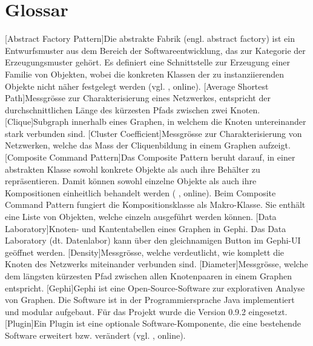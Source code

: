 \chapter*{Glossar}

\begin{acronym}
    [Abstract Factory Pattern]{Die abstrakte Fabrik (engl. abstract factory) ist ein Entwurfsmuster aus dem Bereich der Softwareentwicklung, das zur Kategorie der Erzeugungsmuster gehört. Es definiert eine Schnittstelle zur Erzeugung einer Familie von Objekten, wobei die konkreten Klassen der zu instanziierenden Objekte nicht näher festgelegt werden (vgl. \citeauthor{wikipedia_abstrakte_2018} \citeyear{wikipedia_abstrakte_2018}, online).}
    [Average Shortest Path]{Messgrösse zur Charakterisierung eines Netzwerkes, entspricht der durchschnittlichen Länge des kürzesten Pfads zwischen zwei Knoten.}
    [Clique]{Subgraph innerhalb eines Graphen, in welchem die Knoten untereinander stark verbunden sind.}
    [Cluster Coefficient]{Messgrösse zur Charakterisierung von Netzwerken, welche das Mass der Cliquenbildung in einem Graphen aufzeigt.}
    [Composite Command Pattern]{Das Composite Pattern beruht darauf, in einer abstrakten Klasse sowohl konkrete Objekte als auch ihre Behälter zu repräsentieren. Damit können sowohl einzelne Objekte als auch ihre Kompositionen einheitlich behandelt werden (\citeauthor{wikipedia_kompositum_2019} \citeyear{wikipedia_kompositum_2019}, online). Beim Composite Command Pattern fungiert die Kompositionsklasse als Makro-Klasse. Sie enthält eine Liste von Objekten, welche einzeln ausgeführt werden können.}
    [Data Laboratory]{Knoten- und Kantentabellen eines Graphen in Gephi. Das Data Laboratory (dt. Datenlabor) kann über den gleichnamigen Button im Gephi-UI geöffnet werden.}
    [Density]{Messgrösse, welche verdeutlicht, wie komplett die Knoten des Netzwerks miteinander verbunden sind.}
    [Diameter]{Messgrösse, welche dem längsten kürzesten Pfad zwischen allen Knotenpaaren in einem Graphen entspricht.}
    [Gephi]{Gephi ist eine Open-Source-Software zur explorativen
    Analyse von Graphen. Die Software ist in der Programmiersprache Java implementiert
    und modular aufgebaut. Für das Projekt wurde die Version 0.9.2 eingesetzt.}
    [Plugin]{Ein Plugin ist eine optionale Software-Komponente, die eine bestehende Software erweitert bzw. verändert (vgl. \citeauthor{wikipedia_plug-_2019} \citeyear{wikipedia_plug-_2019}, online).}

\end{acronym}
